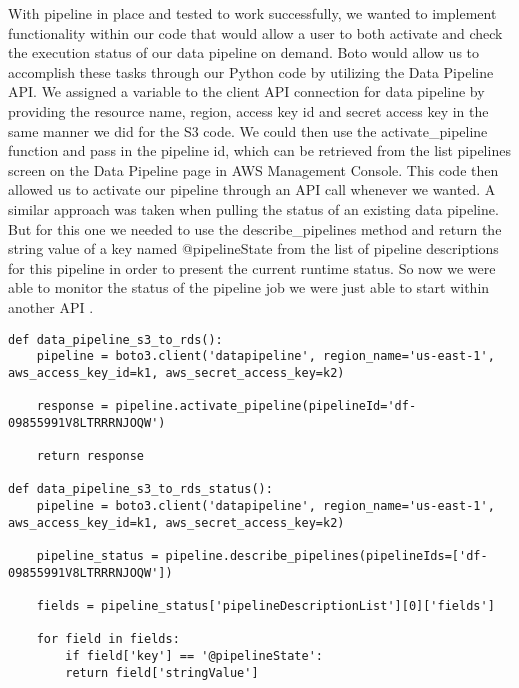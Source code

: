 With pipeline in place and tested to work successfully, we wanted to implement 
functionality within our code that would allow a user to both activate and 
check the execution status of our data pipeline on demand.  Boto would allow 
us to accomplish these tasks through our Python code by utilizing the Data 
Pipeline API. We assigned a variable to the client API connection for data 
pipeline by providing the resource name, region, access key id and secret 
access key in the same manner we did for the S3 code. We could then use the 
activate_pipeline function and pass in the pipeline id, which can be retrieved 
from the list pipelines screen on the Data Pipeline page in AWS Management 
Console. This code then allowed us to activate our pipeline through an API 
call whenever we wanted. A similar approach was taken when pulling the status 
of an existing data pipeline. But for this one we needed to use the 
describe_pipelines method and return the string value of a key named 
@pipelineState from the list of pipeline descriptions for this pipeline in 
order to present the current runtime status. So now we were able to monitor 
the status of the pipeline job we were just able to start within another 
API \cite{hid-sp18-521-botodatapipeline}.  

\begin{verbatim}
def data_pipeline_s3_to_rds():
    pipeline = boto3.client('datapipeline', region_name='us-east-1', aws_access_key_id=k1, aws_secret_access_key=k2)

    response = pipeline.activate_pipeline(pipelineId='df-09855991V8LTRRRNJOQW')

    return response

def data_pipeline_s3_to_rds_status():
    pipeline = boto3.client('datapipeline', region_name='us-east-1', aws_access_key_id=k1, aws_secret_access_key=k2)

    pipeline_status = pipeline.describe_pipelines(pipelineIds=['df-09855991V8LTRRRNJOQW'])

    fields = pipeline_status['pipelineDescriptionList'][0]['fields']

    for field in fields:
        if field['key'] == '@pipelineState':
	    return field['stringValue']
\end{verbatim}

